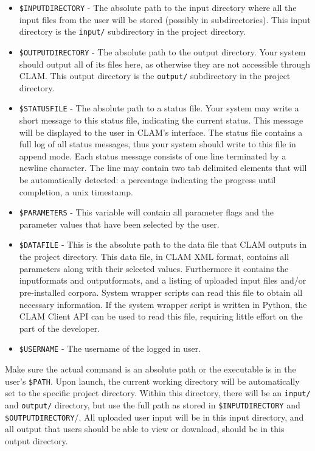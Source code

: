 \documentclass[a4paper,12pt]{report}
\begin{document}
\begin{itemize}
\item \texttt{\$INPUTDIRECTORY} - The absolute path to the input directory where all the input files from the user will be stored (possibly in subdirectories). This input directory is the \texttt{input/} subdirectory in the project directory.
\item \texttt{\$OUTPUTDIRECTORY} - The absolute path to the output directory. Your system should output all of its files here, as otherwise they are not accessible through CLAM.  This output directory is the \texttt{output/} subdirectory in the project directory.
\item \texttt{\$STATUSFILE} - The absolute path to a status file. Your system may write a short message to this status file, indicating the current status. This message will be displayed to the user in CLAM's interface. The status file contains a full log of all status messages, thus your system should write to this file in append mode. Each status message consists of one line terminated by a newline character. The line may contain two tab delimited elements that will be automatically detected: a percentage indicating the progress until completion, a unix timestamp.
\item \texttt{\$PARAMETERS} - This variable will contain all parameter flags and the parameter values that have been selected by the user.
\item \texttt{\$DATAFILE} - This is the absolute path to the data file that CLAM outputs in the project directory. This data file, in CLAM XML format, contains all parameters along with their selected values. Furthermore it contains the inputformats and outputformats, and a listing of uploaded input files and/or pre-installed corpora. System wrapper scripts can read this file to obtain all necessary information. If the system wrapper script is written in Python, the CLAM Client API can be used to read this file, requiring little effort on the part of the developer.
\item \texttt{\$USERNAME} - The username of the logged in user.
\end{itemize}


Make sure the actual command is an absolute path or the executable is in the user's \texttt{\$PATH}. Upon launch, the current working directory will be automatically set to the specific project directory. Within this directory, there will be an \texttt{input/} and \texttt{output/} directory, but use the full path as stored in \texttt{\$INPUTDIRECTORY} and \texttt{\$OUTPUTDIRECTORY}/. All uploaded user input will be in this input directory, and all output that users should be able to view or download, should be in this output directory.
\end{document}

